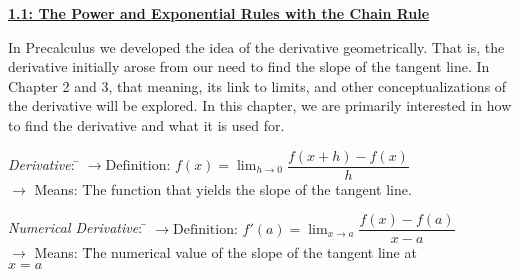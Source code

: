 \textbf{\underline{\large{1.1: The Power and Exponential Rules with the Chain Rule}}} \par

In Precalculus we developed the idea of the derivative geometrically. That is, the derivative initially arose from our need to find the slope of the tangent line. In Chapter 2 and 3, that meaning, its link to limits, and other conceptualizations of the derivative will be explored. In this chapter, we are primarily interested in how to find the derivative and what it is used for. \par

\begin{tabbing}
    \textit{Derivative}: \= $\rightarrow \text{Definition: } f(x) = \lim_{h \to 0} \dfrac{f(x + h) - f(x)}{h}$ \\[5.5pt]
    \> $\rightarrow$ {Means:  The function that yields the slope of the tangent line.}
\end{tabbing}
\begin{tabbing}
    \textit{Numerical Derivative}: \= $\rightarrow \text{Definition: } f'(a) = \lim_{x \to a} \dfrac{f(x) - f(a)}{x - a}$ \\[5.5pt]
    \> $\rightarrow$ Means: \= The numerical value of the slope of the tangent line at \\
    \> \> $x = a$ 
\end{tabbing}

\begin{center}  
\end{center}
\begin{center}
\end{center}


